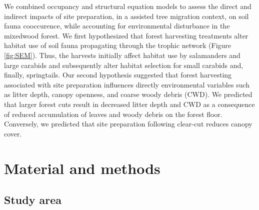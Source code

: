 We combined occupancy and structural equation models to assess the direct and indirect impacts of site preparation, in a assisted tree migration context, 
on soil fauna cooccurence, while accounting for environmental disturbance in the mixedwood forest.
We first hypothesized that forest harvesting treatments alter habitat use of soil fauna propagating through the trophic network (Figure \ref*{fig:SEM}). 
Thus, the harvests initially affect habitat use by salamanders and large carabids and subsequently alter habitat selection for small carabids and, finally, springtails.
Our second hypothesis suggested that forest harvesting associated with site preparation influences directly environmental variables such as litter depth, canopy openness, and coarse woody debris (CWD). 
We predicted that larger forest cuts result in decreased litter depth and CWD as a consequence of reduced accumulation of leaves and woody debris on the forest floor.
Conversely, we predicted that site preparation following clear-cut reduces canopy cover.

\section*{Material and methods}
\label{sec:matmet1}

\subsection*{Study area}
\label{subsec:area}

